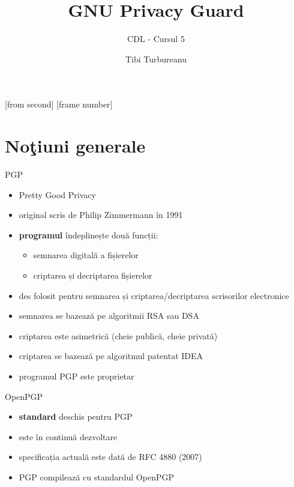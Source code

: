 \documentclass{beamer}
\title[GNU Privacy Guard]{GNU Privacy Guard}
\subtitle{CDL - Cursul 5}
\institute{Ceata}
\author{Tibi Turbureanu}
\begin{document}
[from second]
[frame number]

\frame{\titlepage}

\frame{\tableofcontents}

\section{No\c{t}iuni generale}

\frame{\tableofcontents[currentsection]}

\begin{frame}{PGP}
  \begin{itemize}
    \item Pretty Good Privacy
    \item original scris de Philip Zimmermann în 1991
    \item \textbf{programul} îndeplinește două funcții: 
    \begin{itemize}
      \item semnarea digitală a fișierelor
      \item criptarea și decriptarea fișierelor
    \end{itemize} 
    \item des folosit pentru semnarea și criptarea/decriptarea scrisorilor
    electronice
    \item semnarea se bazează pe algoritmii RSA sau DSA
    \item criptarea este asimetrică (cheie publică, cheie privată)
    \item criptarea se bazează pe algoritmul patentat IDEA
    \item programul PGP este proprietar
  \end{itemize}
\end{frame}

\begin{frame}{OpenPGP}
  \begin{itemize}
    \item \textbf{standard} deschis pentru PGP
    \item este în continuă dezvoltare
    \item specificația actuală este dată de RFC 4880 (2007)
    \item PGP compilează cu standardul OpenPGP
  \end{itemize}
\end{frame}
\end{document}
